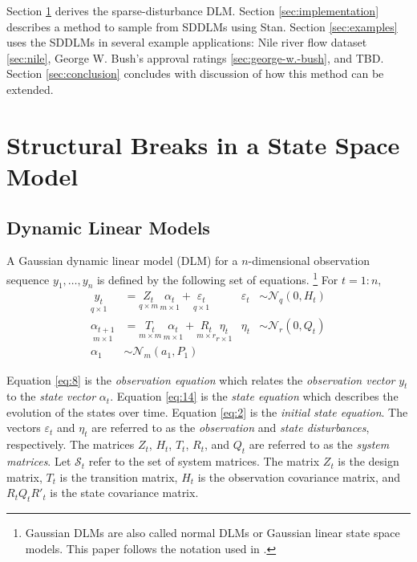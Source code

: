 \documentclass{article}
\newcommand{\dist}[1]{\mathcal{#1}}
\newcommand{\paren}[1]{\ensuremath{\left(#1\right)}}
\newcommand{\dmvnorm}[2]{\ensuremath{\dist{N}_{#2}\paren{#1}}}
\begin{document}
Section \ref{sec:struct-breaks-state} derives the sparse-disturbance DLM.
Section \ref{sec:implementation} describes a method to sample from SDDLMs using Stan.
Section \ref{sec:examples} uses the SDDLMs in several example applications: Nile river flow dataset \ref{sec:nile}, George W. Bush's approval ratings \ref{sec:george-w.-bush}, and TBD.
Section \ref{sec:conclusion} concludes with discussion of how this method can be extended.

\section{Structural Breaks in a State Space Model}
\label{sec:struct-breaks-state}

\subsection{Dynamic Linear Models}
\label{sec:dynam-line-models}

A Gaussian dynamic linear model (DLM) for a $n$-dimensional observation sequence $y_{1}, \dots, y_{n}$ is defined by the following set of equations.%
\footnote{
Gaussian DLMs are also called normal DLMs or Gaussian linear state space models.
This paper follows the notation used in \textcite{DurbinKoopman2001}.
}
For $t = 1:n$,
\begin{align}
  \label{eq:8}
  \underset{q \times 1}{y_t} &= \underset{q \times m}{Z_{t}} \, \underset{m \times 1}{\alpha_t} + \underset{q \times 1}{\varepsilon_t} & \varepsilon_{t} &\sim \dmvnorm{0, H_{t}}{q} \\
  \label{eq:14}
  \underset{m \times 1}{\alpha_{t+1}} &= \underset{m \times m}{T_{t}} \, \underset{m \times 1}{\alpha_{t}} + \underset{m \times r}{R_{t}}  \underset{r \times 1}{\eta_{t}} & \eta_{t} &\sim \dmvnorm{0, Q_{t}}{r} \\
  \label{eq:2}
  \alpha_{1} & \sim \dmvnorm{a_{1}, P_{1}}{m}
\end{align}


Equation \eqref{eq:8} is the \textit{observation equation} which relates the \textit{observation vector} $y_{t}$ to the \textit{state vector} $\alpha_{t}$.
Equation \eqref{eq:14} is the \textit{state equation} which describes the evolution of the states over time.
Equation \eqref{eq:2} is the \textit{initial state equation}.
The vectors $\varepsilon_{t}$ and $\eta_{t}$ are referred to as the \textit{observation} and \textit{state disturbances}, respectively.
The matrices $Z_{t}$, $H_{t}$, $T_{t}$, $R_{t}$, and $Q_{t}$ are referred to as the \textit{system matrices}.
Let $\mathcal{S}_{t}$ refer to the set of system matrices.
The matrix $Z_{t}$ is the design matrix, $T_{t}$ is the transition matrix, $H_{t}$ is the observation covariance matrix, and $R_{t} Q_{t} R'_{t}$ is the state covariance matrix.
\end{document}
